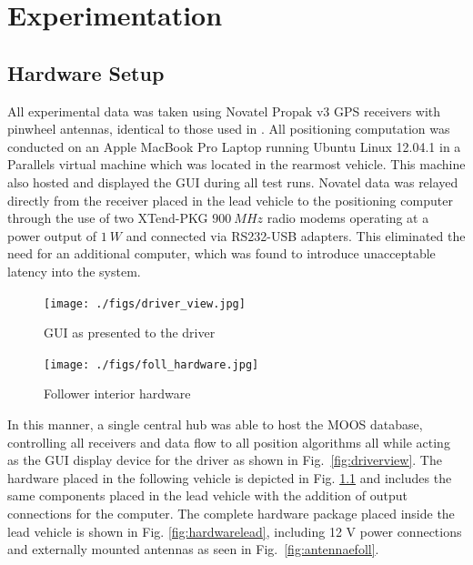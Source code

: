 \chapter{Experimentation} \label{chap:exper}




\section{Hardware Setup} \label{sec:hardware}

All experimental data was taken using Novatel Propak v3 GPS receivers with pinwheel antennas, identical to those used in \cite{scottthesis}. All positioning computation was conducted on an Apple MacBook Pro Laptop running Ubuntu Linux 12.04.1 in a Parallels virtual machine which was located in the rearmost vehicle. This machine also hosted and displayed the GUI during all test runs. Novatel data was relayed directly from the receiver placed in the lead vehicle to the positioning computer through the use of two XTend-PKG $900~MHz$ radio modems operating at a power output of $1~W$ and connected via RS232-USB adapters. This eliminated the need for an additional computer, which was found to introduce unacceptable latency into the system.

\begin{figure}[ht] \centering
    \begin{minipage}[b]{0.45\linewidth} \centering 
        \texttt{[image: ./figs/driver\_view.jpg]}
        \caption{GUI as presented to the driver} \label{fig:driverview}
    \end{minipage}
    \hspace{0.5cm}
    \begin{minipage}[b]{0.45\linewidth} \centering
        \texttt{[image: ./figs/foll\_hardware.jpg]}
        \caption{Follower interior hardware} \label{fig:hardwarefoll}
    \end{minipage}
\end{figure}

In this manner, a single central hub was able to host the MOOS database, controlling all receivers and data flow to all position algorithms all while acting as the GUI display device for the driver as shown in Fig.~\ref{fig:driverview}. The hardware placed in the following vehicle is depicted in Fig. \ref{fig:hardwarefoll} and includes the same components placed in the lead vehicle with the addition of output connections for the computer. The complete hardware package placed inside the lead vehicle is shown in Fig. \ref{fig:hardwarelead}, including 12 V power connections and externally mounted antennas as seen in Fig.~\ref{fig:antennaefoll}.

